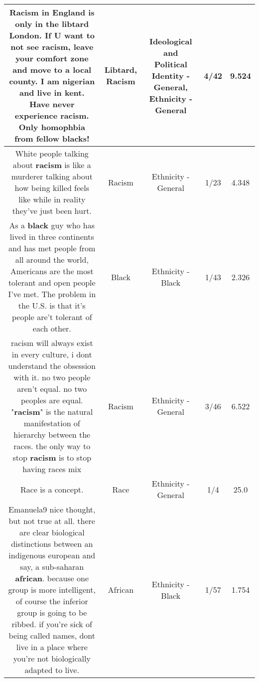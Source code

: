 \documentclass[11pt]{article}
\newlength\mylength
\begin{document}
\begin{center}
\begin{longtable}{|C{.65\mylength}|C{.30\mylength}|C{.12\mylength}|C{.12\mylength}|C{.12\mylength}|}
  \small Racism in England is only in the \textbf{libtard} London. If U want to not see \textbf{racism}, leave your comfort zone and move to a local county. I am nigerian and live in kent. Have never experience \textbf{racism}. Only homophbia from fellow blacks!\normalsize   & Libtard, Racism &  Ideological and Political Identity - General, Ethnicity - General & 4/42 & 9.524 \\  \hline
  \small White people talking about \textbf{racism} is like a murderer talking about how being killed feels like while in reality they've just been hurt.\normalsize   & Racism & Ethnicity - General & 1/23 & 4.348 \\  \hline
  \small As a \textbf{black} guy who has lived in three continents and has met people from all around the world, Americans are the most tolerant and open people I've met. The problem in the U.S. is that it's people are't tolerant of each other.\normalsize   & Black & Ethnicity - Black & 1/43 & 2.326 \\  \hline
  \small racism will always exist in every culture, i dont understand the obsession with it. no two people aren't equal. no two peoples are equal. "\textbf{racism}" is the natural manifestation of hierarchy between the races. the only way to stop \textbf{racism} is to stop having races mix\normalsize   & Racism & Ethnicity - General & 3/46 & 6.522 \\  \hline
  \small Race is a concept.\normalsize   & Race & Ethnicity - General & 1/4 & 25.0 \\  \hline
  \small Emanuela9 nice thought, but not true at all. there are clear biological distinctions between an indigenous european and say, a sub-saharan \textbf{african}. because one group is more intelligent, of course the inferior group is going to be ribbed. if you're sick of being called names, dont live in a place where you're not biologically adapted to live.\normalsize   & African & Ethnicity - Black & 1/57 & 1.754 \\  \hline

\end{longtable}
\end{center}
\end{document}
